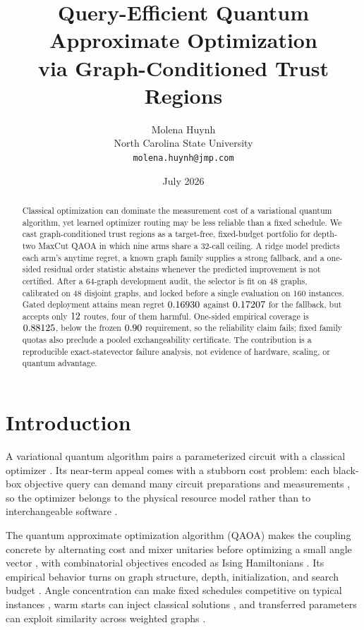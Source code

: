 \documentclass[10pt,twocolumn]{article}
\title{\textbf{Query-Efficient Quantum Approximate Optimization\\
via Graph-Conditioned Trust Regions}}
\author{Molena Huynh\\
North Carolina State University\\
\texttt{molena.huynh@jmp.com}}
\date{July 2026}
\makeatletter
\newcounter{algorithm}
\renewcommand{\maketitle}{%
  \twocolumn[
  \begin{@twocolumnfalse}
    \vspace*{-1.6em}
    \hrule height 0.8pt
    \vspace{1.15em}
    \begin{center}
      {\LARGE\bfseries \@title\par}
    \end{center}
    \vspace{0.75em}
    \hrule height 0.8pt
    \vspace{1.15em}
    \begin{center}
      {\normalsize \@author\par}
    \end{center}
    \vspace{0.9em}
  \end{@twocolumnfalse}]
  \thispagestyle{plain}
}
\makeatother
\begin{document}
\maketitle

\begin{abstract}
Classical optimization can dominate the measurement cost of a variational
quantum algorithm, yet learned optimizer routing may be less reliable than a
fixed schedule.  We cast graph-conditioned trust regions as a target-free,
fixed-budget portfolio for depth-two MaxCut QAOA in which nine arms share a
$32$-call ceiling.  A ridge model predicts each arm's anytime regret, a known
graph family supplies a strong fallback, and a one-sided residual order
statistic abstains whenever the predicted improvement is not certified.  After a
$64$-graph development audit, the selector is fit on $48$ graphs, calibrated on
$48$ disjoint graphs, and locked before a single evaluation on $160$ instances.
Gated deployment attains mean regret $0.16930$ against
$0.17207$ for the fallback, but accepts only $12$
routes, four of them harmful.  One-sided empirical coverage is
$0.88125$, below the frozen $0.90$ requirement, so the
reliability claim fails; fixed family quotas also preclude a pooled
exchangeability certificate.  The contribution is a reproducible
exact-statevector failure analysis, not evidence of hardware, scaling, or
quantum advantage.
\end{abstract}

\section{Introduction}

A variational quantum algorithm pairs a parameterized circuit with a classical
optimizer \citep{peruzzo2014variational,mcclean2016theory}.  Its near-term
appeal comes with a stubborn cost problem: each black-box objective query can
demand many circuit preparations and measurements
\citep{preskill2018quantum,bharti2022noisy}, so the optimizer belongs to the
physical resource model rather than to interchangeable software
\citep{cerezo2021variational}.

The quantum approximate optimization algorithm (QAOA) makes the coupling
concrete by alternating cost and mixer unitaries before optimizing a small angle
vector \citep{farhi2014qaoa,hadfield2019alternating}, with combinatorial
objectives encoded as Ising Hamiltonians \citep{lucas2014ising}.  Its empirical
behavior turns on graph structure, depth, initialization, and search budget
\citep{zhou2020qaoa}.  Angle concentration can make fixed schedules competitive
on typical instances \citep{brandao2018fixed,akshay2021concentration}, warm
starts can inject classical solutions \citep{egger2021warm}, and transferred
parameters can exploit similarity across weighted graphs
\citep{shaydulin2023weighted}.
\end{document}
